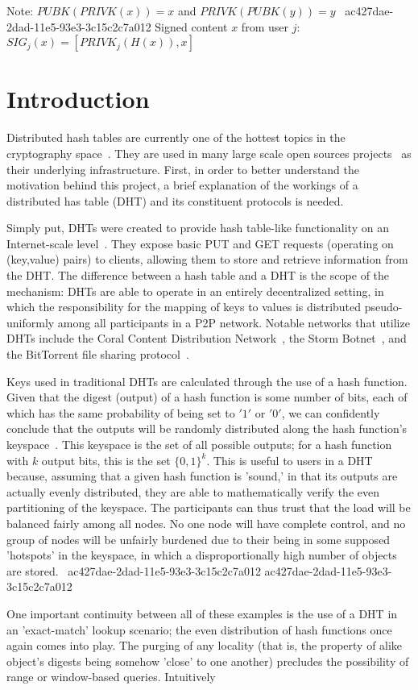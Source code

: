 \documentclass[12pt]{article}
\begin{document}
Note: $PUBK(PRIVK(x)) = x$ and $PRIVK(PUBK(y)) = y$~
ac427dae-2dad-11e5-93e3-3c15c2c7a012
Signed content $x$ from user $j$: $SIG_j(x) = \left[ PRIVK_j( H(x) ), x \right]$

\section{Introduction}
\par Distributed hash tables are currently one of the hottest topics in the cryptography space~\cite{Stoica:2001dj,Rowstron:2001ea,Ratnasamy:2001wn}. They are used in many large scale open sources projects~\cite{Freitas:2013tb,Xu:2010vs,Perfitt:2010fh} as their underlying infrastructure. First, in order to better understand the motivation behind this project, a brief explanation of the workings of a distributed has table (DHT) and its constituent protocols is needed.

\par Simply put, DHTs were created to provide hash table-like functionality on an Internet-scale level~\cite{Ratnasamy:2001wn}. They expose basic PUT and GET requests (operating on (key,value) pairs) to clients, allowing them to store and retrieve information from the DHT. The difference between a hash table and a DHT is the scope of the mechanism: DHTs are able to operate in an entirely decentralized setting, in which the responsibility for the mapping of keys to values is distributed pseudo-uniformly among all participants in a P2P network. Notable networks that utilize DHTs include the Coral Content Distribution Network~\cite{Freedman:2004vb}, the Storm Botnet~\cite{Holz:2008uk}, and the BitTorrent file sharing protocol~\cite{Cohen:y1_8mBnw}.

\par Keys used in traditional DHTs are calculated through the use of a hash function. Given that the digest (output) of a hash function is some number of bits, each of which has the same probability of being set to $'1'$ or $'0'$, we can confidently conclude that the outputs will be randomly distributed along the hash function's keyspace~. This keyspace is the set of all possible outputs; for a hash function with $k$ output bits, this is the set $\{0,1\}^k$. This is useful to users in a DHT because, assuming that a given hash function is 'sound,' in that its outputs are actually evenly distributed, they are able to mathematically verify the even partitioning of the keyspace. The participants can thus trust that the load will be balanced fairly among all nodes. No one node will have complete control, and no group of nodes will be unfairly burdened due to their being in some supposed 'hotspots' in the keyspace, in which a disproportionally high number of objects are stored.~
ac427dae-2dad-11e5-93e3-3c15c2c7a012
ac427dae-2dad-11e5-93e3-3c15c2c7a012\par One important continuity between all of these examples is the use of a DHT in an 'exact-match' lookup scenario; the even distribution of hash functions once again comes into play. The purging of any locality (that is, the property of alike object's digests being somehow 'close' to one another) precludes the possibility of range or window-based queries. Intuitively
\end{document}

